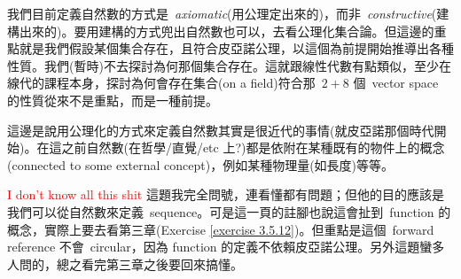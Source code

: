 \begin{remark}\label{remark 2.1.14}
我們目前定義自然數的方式是\ \emph{axiomatic}(用公理定出來的)，而非\ \emph{constructive}(建構出來的)。要用建構的方式兜出自然數也可以，去看公理化集合論。但這邊的重點就是我們假設某個集合存在，且符合皮亞諾公理，以這個為前提開始推導出各種性質。我們(暫時)不去探討為何那個集合存在。這就跟線性代數有點類似，至少在線代的課程本身，探討為何會存在集合(on a field)符合那\ \(2+8\) 個\ vector space 的性質從來不是重點，而是一種前提。
\end{remark}

\begin{remark}\label{remark 2.1.15}
這邊是說用公理化的方式來定義自然數其實是很近代的事情(就皮亞諾那個時代開始)。在這之前自然數(在哲學/直覺/etc 上?)都是依附在某種既有的物件上的概念(connected to some external concept)，例如某種物理量(如長度)等等。
\end{remark}

\begin{proposition}\label{prop 2.1.16}
\textcolor{red}{I don't know all this shit} 這題我完全問號，連看懂都有問題；但他的目的應該是我們可以從自然數來定義\ sequence。可是這一頁的註腳也說這會扯到\ function 的概念，實際上要去看第三章(Exercise \ref{exercise 3.5.12})。但重點是這個\ forward reference 不會\ circular，因為 function 的定義不依賴皮亞諾公理。另外這題蠻多人問的，總之看完第三章之後要回來搞懂。
\end{proposition}